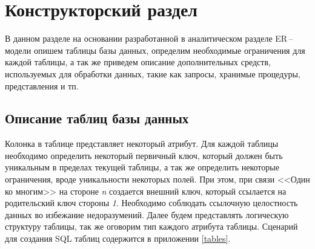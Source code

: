 \section{Конструкторский раздел}
В данном разделе на основании разработанной в аналитическом разделе
ER\,--\,модели опишем таблицы базы данных, определим необходимые ограничения для каждой
таблицы, а так же приведем описание дополнительных средств, используемых для обработки
данных, такие как запросы, хранимые процедуры, представления и тп.

\subsection{Описание таблиц базы данных}
Колонка в таблице представляет некоторый атрибут. Для каждой таблицы необходимо определить
некоторый первичный ключ, который должен быть уникальным в пределах текущей таблицы, а так
же определить некоторые ограничения, вроде уникальности некоторых полей. При этом, при
связи <<Один ко многим>> на стороне \textit{n} создается внешний ключ, который ссылается
на родительский ключ стороны \textit{1}.
Необходимо соблюдать ссылочную целостность данных во избежание недоразумений. Далее будем
представлять логическую структуру таблицы, так же оговорим тип каждого атрибута таблицы.
Сценарий для создания SQL таблиц содержится в приложении \ref{tables}.
